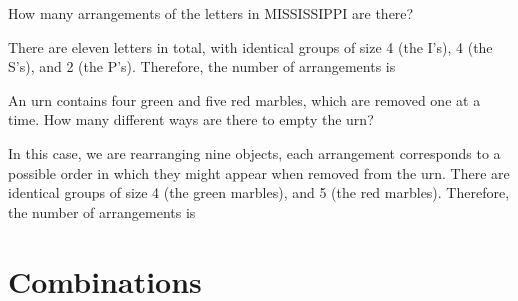 \par
\begin{examp}
How many arrangements of the letters in MISSISSIPPI are there?
\par
\noindent There are eleven letters in total, with identical groups of size 4 (the I's), 4 (the S's), and 2 (the P's). Therefore, the number of arrangements is
\end{examp}
\begin{examp}
An urn contains four green and five red marbles, which are removed one at a time. How many different ways are there to empty the urn?
\par
\noindent In this case, we are rearranging nine objects, each arrangement corresponds to a possible order in which they might appear when removed from the urn. There are identical groups of size 4 (the green marbles), and 5 (the red marbles). Therefore, the number of arrangements is
\end{examp}

\section{Combinations}\label{sec 2.2}

